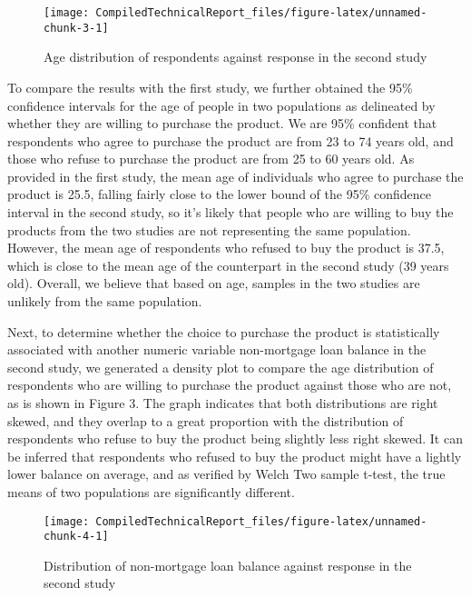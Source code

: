 \documentclass[]{article}
\begin{document}
\begin{figure}

{\centering \texttt{[image: CompiledTechnicalReport\_files/figure-latex/unnamed-chunk-3-1]} 

}

\caption{Age distribution of respondents against response in the second study}\label{fig:unnamed-chunk-3}
\end{figure}

To compare the results with the first study, we further obtained the
95\% confidence intervals for the age of people in two populations as
delineated by whether they are willing to purchase the product. We are
95\% confident that respondents who agree to purchase the product are
from 23 to 74 years old, and those who refuse to purchase the product
are from 25 to 60 years old. As provided in the first study, the mean
age of individuals who agree to purchase the product is 25.5, falling
fairly close to the lower bound of the 95\% confidence interval in the
second study, so it's likely that people who are willing to buy the
products from the two studies are not representing the same population.
However, the mean age of respondents who refused to buy the product is
37.5, which is close to the mean age of the counterpart in the second
study (39 years old). Overall, we believe that based on age, samples in
the two studies are unlikely from the same population.

Next, to determine whether the choice to purchase the product is
statistically associated with another numeric variable non-mortgage loan
balance in the second study, we generated a density plot to compare the
age distribution of respondents who are willing to purchase the product
against those who are not, as is shown in Figure 3. The graph indicates
that both distributions are right skewed, and they overlap to a great
proportion with the distribution of respondents who refuse to buy the
product being slightly less right skewed. It can be inferred that
respondents who refused to buy the product might have a lightly lower
balance on average, and as verified by Welch Two sample t-test, the true
means of two populations are significantly different.

\begin{figure}

{\centering \texttt{[image: CompiledTechnicalReport\_files/figure-latex/unnamed-chunk-4-1]} 

}

\caption{Distribution of non-mortgage loan balance against response in the second study}\label{fig:unnamed-chunk-4}
\end{figure}
\end{document}
